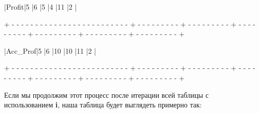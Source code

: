 \begin{tcolorbox}
\hspace{0.4mm}|\hspace{17.6mm}Profit\hspace{17.6mm}|\hspace{7.1mm}5\hspace{7.1mm} |\hspace{7.1mm}6\hspace{7.1mm} |\hspace{7.1mm}5\hspace{7.1mm} |\hspace{7.1mm}4\hspace{7.1mm} |\hspace{5.8mm}11\hspace{5.8mm} |\hspace{7.1mm}2\hspace{7.1mm} |

{\tiny{+ - - - - - - - - - - - - - - - - - - - - - - - - - + - - - - - - - - - + - - - - - - - - - + - - - - - - - - - + - - - - - - - - - + - - - - - - - - - + - - - - - - - - - +}}

\hspace{0.4mm}|\hspace{14mm}Acc\_Prof\hspace{14mm}|\hspace{7.1mm}5\hspace{7.1mm} |\hspace{7.1mm}6\hspace{7.1mm} |\hspace{6mm}10\hspace{6mm} |\hspace{6mm}10\hspace{6mm} |\hspace{5.8mm}11\hspace{5.8mm} |\hspace{7.1mm}2\hspace{7.1mm} |

{\tiny{+ - - - - - - - - - - - - - - - - - - - - - - - - - + - - - - - - - - - + - - - - - - - - - + - - - - - - - - - + - - - - - - - - - + - - - - - - - - - + - - - - - - - - - +}}
\end{tcolorbox}

\vspace{\baselineskip}
Если мы продолжим этот процесс после итерации всей таблицы с использованием \textbf{i}, наша таблица будет выглядеть примерно так: 

